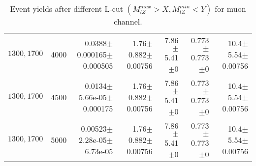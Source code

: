 \documentclass[]{article}
\begin{document}
\begin{table}
\begin{center}
{\begin{tabular}{ |r|r|r|r|r|r|r|}
$1300, 1700$ & 4000 & 0.0388$\pm$0.000165$\pm$0.000505 & 1.76$\pm$0.882$\pm$0.00756 & 7.86$\pm$5.41$\pm$0 & 0.773$\pm$0.773$\pm$0 & 10.4$\pm$5.54$\pm$0.00756 \\
$1300, 1700$ & 4500 & 0.0134$\pm$5.66e-05$\pm$0.000175 & 1.76$\pm$0.882$\pm$0.00756 & 7.86$\pm$5.41$\pm$0 & 0.773$\pm$0.773$\pm$0 & 10.4$\pm$5.54$\pm$0.00756 \\
$1300, 1700$ & 5000 & 0.00523$\pm$2.28e-05$\pm$6.73e-05 & 1.76$\pm$0.882$\pm$0.00756 & 7.86$\pm$5.41$\pm$0 & 0.773$\pm$0.773$\pm$0 & 10.4$\pm$5.54$\pm$0.00756 \\
\hline 
\end{tabular}
}
\end{center}
\caption{Event yields after different L-cut $(M_{lZ}^{max} > X, M_{lZ}^{min} < Y)$ for muon channel.}
\end{table}
\end{document}

